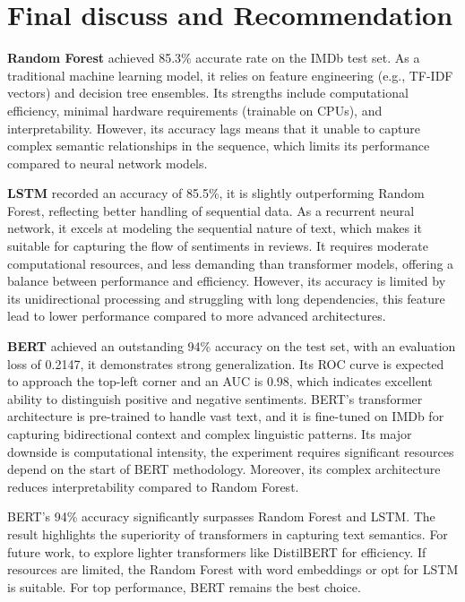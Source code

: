 \section{Final discuss and Recommendation}

\textbf{Random Forest} achieved 85.3\% accurate rate on the IMDb test set. As a traditional machine learning model, it relies on feature engineering (e.g., TF-IDF vectors) and decision tree ensembles. Its strengths include computational efficiency, minimal hardware requirements (trainable on CPUs), and interpretability. However, its accuracy lags means that it unable to capture complex semantic relationships in the sequence, which limits its performance compared to neural network models.

\textbf{LSTM} recorded an accuracy of 85.5\%, it is slightly outperforming Random Forest, reflecting better handling of sequential data. As a recurrent neural network, it excels at modeling the sequential nature of text, which makes it suitable for capturing the flow of sentiments in reviews. It requires moderate computational resources, and less demanding than transformer models, offering a balance between performance and efficiency. However, its accuracy is limited by its unidirectional processing and struggling with long dependencies, this feature lead to lower performance compared to more advanced architectures.

\textbf{BERT} achieved an outstanding 94\% accuracy on the test set, with an evaluation loss of 0.2147, it demonstrates strong generalization. Its ROC curve is expected to approach the top-left corner and an AUC is 0.98, which indicates excellent ability to distinguish positive and negative sentiments. BERT's transformer architecture is pre-trained to handle vast text, and it is fine-tuned on IMDb for capturing bidirectional context and complex linguistic patterns. Its major downside is computational intensity, the experiment requires significant resources depend on the start of BERT methodology. Moreover, its complex architecture reduces interpretability compared to Random Forest.

BERT's 94\% accuracy significantly surpasses Random Forest and LSTM. The result highlights the superiority of transformers in capturing text semantics. For future work, to explore lighter transformers like DistilBERT for efficiency. If resources are limited, the Random Forest with word embeddings or opt for LSTM is suitable. For top performance, BERT remains the best choice.